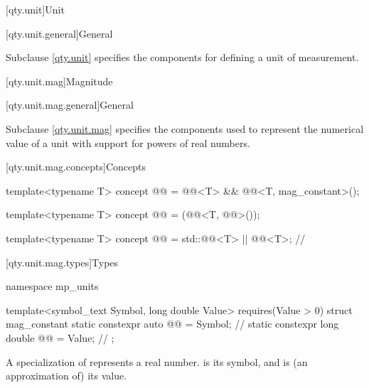 [qty.unit]{Unit}

[qty.unit.general]{General}

\pnum
Subclause \ref{qty.unit} specifies the components
for defining a unit of measurement.

[qty.unit.mag]{Magnitude}

[qty.unit.mag.general]{General}

\pnum
Subclause \ref{qty.unit.mag} specifies the components
used to represent the numerical value of a unit
with support for powers of real numbers.

[qty.unit.mag.concepts]{Concepts}

\begin{itemdecl}
template<typename T>
concept @@ = @@<T> && @@<T, mag_constant>();

template<typename T>
concept @@ = (@@<T, @@>());

template<typename T>
concept @@ = std::@@<T> || @@<T>;  // \expos
\end{itemdecl}

[qty.unit.mag.types]{Types}

\begin{codeblock}
namespace mp_units {

template<symbol_text Symbol, long double Value>
  requires(Value > 0)
struct mag_constant {
  static constexpr auto @@ = Symbol;       // \expos
  static constexpr long double @@ = Value;  // \expos
};

}
\end{codeblock}

A specialization of  represents a real number.
 is its symbol, and
 is (an approximation of) its value.

